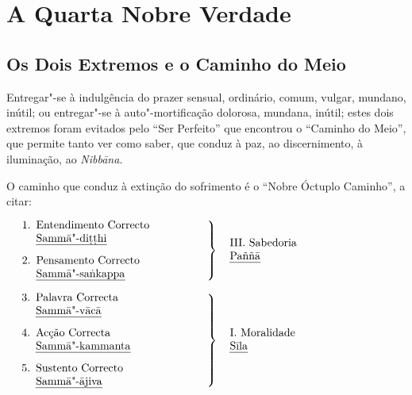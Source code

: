 
\chapter{A Quarta Nobre Verdade}


\section{Os Dois Extremos e o Caminho do Meio}

Entregar"-se à indulgência do prazer sensual, ordinário, comum, vulgar, mundano,
inútil; ou entregar"-se à auto"-mortificação dolorosa, mundana, inútil; estes dois
extremos foram evitados pelo “Ser Perfeito” que encontrou o “Caminho do
Meio”, que permite tanto ver como saber, que conduz à paz, ao discernimento,
à iluminação, ao \emph{Nibbāna}.

O caminho que conduz à extinção do sofrimento é o “Nobre Óctuplo Caminho”, a
citar:

\clearpage

$\left.
\begin{minipage}{0.52\linewidth}
\raggedright
\begin{enumerate}
  \item Entendimento Correcto\newline
        \emph{Sammā"-diṭṭhi}

  \item Pensamento Correcto\newline
        \emph{Sammā"-saṅkappa}
\end{enumerate}
\end{minipage}
\right\}
\hspace*{10pt}\parbox{0.4\linewidth}{III. Sabedoria\\ \emph{Paññā}}
$

\bigskip

$\left.
\begin{minipage}{0.52\linewidth}
\raggedright
\begin{enumerate}
\setcounter{enumi}{2}
  \item Palavra Correcta\newline
        \emph{Sammā"-vācā}

  \item Acção Correcta\newline
        \emph{Sammā"-kammanta}

  \item Sustento Correcto\newline
        \emph{Sammā"-ājiva}
\end{enumerate}
\end{minipage}
\right\}
\hspace*{10pt}\parbox{0.4\linewidth}{I. Moralidade\\ \emph{Sīla}}
$

